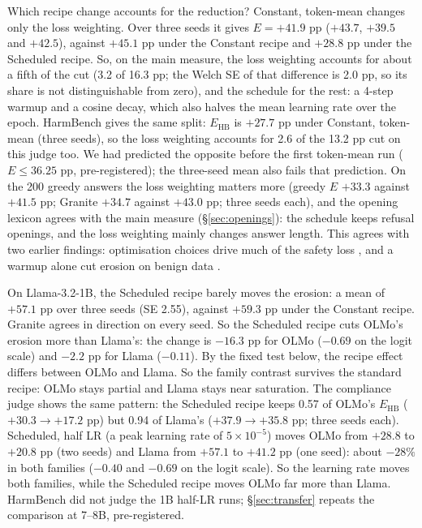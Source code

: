 \documentclass{article}
\newcommand{\Ehb}{E_{\mathrm{HB}}}
\begin{document}
Which recipe change accounts for the reduction? Constant, token-mean
changes only the loss weighting. Over three seeds it gives
$E = +41.9$ pp ($+43.7$, $+39.5$ and $+42.5$), against $+45.1$ pp under the
Constant recipe and $+28.8$ pp under the Scheduled recipe. So, on the main
measure, the loss weighting accounts for about a fifth of the cut (3.2 of
16.3 pp; the Welch SE of that difference is 2.0 pp, so its share is not
distinguishable from zero), and the schedule for the rest: a 4-step warmup and a
cosine decay, which also halves the mean learning rate over the epoch. HarmBench
gives the same split: $\Ehb$ is $+27.7$ pp under Constant, token-mean (three
seeds), so the loss weighting accounts for 2.6 of the 13.2 pp cut on this judge
too. We had
predicted the opposite before the first token-mean run ($E \le 36.25$ pp,
pre-registered); the three-seed mean also fails that prediction. On the 200
greedy answers the loss weighting matters more (greedy $E$ $+33.3$ against
$+41.5$ pp; Granite $+34.7$ against $+43.0$ pp; three seeds each), and the
opening lexicon agrees with the main measure (\S\ref{sec:openings}): the
schedule keeps refusal openings, and the loss weighting mainly changes answer
length. This agrees with two earlier findings: optimisation choices drive much
of the safety loss \citep{kim2025rethinking}, and a warmup alone cut erosion
on benign data \citep{qi2025shallow}.

On Llama-3.2-1B, the Scheduled recipe barely moves the erosion: a mean of
$+57.1$ pp over three seeds (SE 2.55), against $+59.3$ pp under the Constant
recipe. Granite agrees in direction on every seed. So the Scheduled recipe cuts
OLMo's erosion more than Llama's: the change is $-16.3$ pp for OLMo ($-0.69$ on
the logit scale) and $-2.2$ pp for Llama ($-0.11$). By the fixed test below, the
recipe effect differs between OLMo and Llama. So the family contrast survives
the standard recipe: OLMo stays partial and Llama stays near saturation. The
compliance judge shows the same pattern: the Scheduled recipe keeps 0.57 of
OLMo's $\Ehb$ ($+30.3 \to +17.2$ pp) but 0.94 of Llama's ($+37.9 \to +35.8$ pp;
three seeds each). Scheduled, half LR (a peak
learning rate of $5 \times 10^{-5}$) moves OLMo from $+28.8$ to $+20.8$ pp (two
seeds) and Llama from $+57.1$ to $+41.2$ pp (one seed): about $-28\%$ in both
families ($-0.40$ and $-0.69$ on the logit scale). So the learning rate moves
both families, while the Scheduled recipe moves OLMo far more than Llama.
HarmBench did not judge the 1B half-LR runs; \S\ref{sec:transfer} repeats the
comparison at 7--8B, pre-registered.
\end{document}

